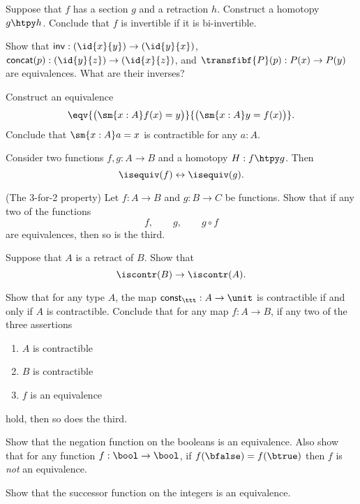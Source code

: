 \begin{exercises}
\item Suppose that $f$ has a section $g$ and a retraction $h$. Construct a homotopy $g\htpy h$. Conclude that $f$ is invertible if it is bi-invertible.
\item Show that $\mathsf{inv}:(\id{x}{y})\to(\id{y}{x})$, $\mathsf{concat}(p):(\id{y}{z})\to(\id{x}{z})$, and $\transfibf{P}(p):P(x)\to P(y)$ are equivalences. What are their inverses?
\item Construct an equivalence 
\begin{equation*}
\eqv{\big(\sm{x:A}f(x)=y\big)}{\big(\sm{x:A}y=f(x)\big)}.
\end{equation*}
Conclude that $\sm{x:A}a=x$ is contractible for any $a:A$.
\item \label{ex:htpy_equiv} Consider two functions $f,g:A\to B$ and a homotopy $H:f\htpy g$. Then
\begin{equation*}
\isequiv(f)\leftrightarrow\isequiv(g).
\end{equation*}
\item \label{ex:3_for_2} (The 3-for-2 property) Let $f:A\to B$ and $g:B\to C$ be functions. Show that if any two of the functions
\begin{equation*}
f,\qquad g,\qquad g\circ f
\end{equation*}
are equivalences, then so is the third.
\item \label{ex:contr_retr}Suppose that $A$ is a retract of $B$. Show that
\begin{equation*}
\iscontr(B)\to\iscontr(A).
\end{equation*}
\item \label{ex:contr_equiv}Show that for any type $A$, the map $\mathsf{const}_\ttt : A\to \unit$ is contractible if and only if $A$ is contractible. Conclude that for any map $f:A\to B$, if any two of the three assertions
\begin{enumerate}
\item $A$ is contractible
\item $B$ is contractible
\item $f$ is an equivalence
\end{enumerate}
hold, then so does the third.
\item \label{ex:neg_equiv} Show that the negation function on the booleans is an equivalence. Also show that for any function $f:\bool\to\bool$, if $f(\bfalse)=f(\btrue)$ then $f$ is \emph{not} an equivalence.
\item \label{ex:succ_equiv} Show that the successor function on the integers is an equivalence.

\end{exercises}
